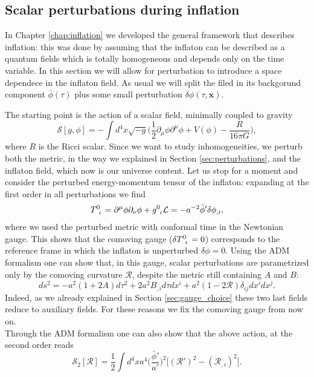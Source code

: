 \subsection{Scalar perturbations during inflation}
In Chapter \ref{chap:inflation} we developed the general framework that describes inflation: this was done by assuming that the inflaton can be described as a quantum fields which is totally homogeneous and depends only on the time variable. In this section we will allow for perturbation to introduce a space dependece in the inflaton field. As usual we will split the filed in its backgorund component $\bar\phi(\tau)$ plus some small perturbation $\delta\phi(\tau,\mathbf x)$.

The starting point is the action of a scalar field, minimally coupled to gravity
$$\mathcal{S} [g,\phi]=-\int d^4x\sqrt{-g}\bigg(\frac{1}{2}\partial_\mu\phi\partial^\mu\phi+V(\phi)-\frac{R}{16\pi G}\bigg),$$where $R$ is the Ricci scalar. Since we want to study inhomogeneities, we perturb both the metric, in the way we explained in Section \ref{sec:perturbations}, and the inflaton field, which now is our universe content. Let us stop for a moment and consider the perturbed energy-momentum tensor of the inflaton: expanding at the first order in all perturbations we find
\begin{align*}
    \tensor{T}{^0_i}=\partial^\mu\phi\partial_\nu\phi+\tensor{g}{^0_i}\mathcal{L}=-a^{-2}\bar\phi'\delta\phi_{,i},
\end{align*}
where we used the perturbed metric with conformal time in the Newtonian gauge. This shows that the comoving gauge ($\delta\tensor{T}{^0_i}=0$) corresponds to the reference frame in which the inflaton is unperturbed $\delta\phi=0$.
Using the ADM formalism one can show that, in this gauge, scalar perturbations are parametrized only by the comoving curvature $\mathcal{R}$, despite the metric still containing $A$ and $B$:
$$ds^2=-a^2(1+2A)d\tau^2+2a^2B_{,i}d\tau dx^i+a^2(1-2\mathcal{R})\delta_{ij}dx^idx^j.$$
Indeed, as we already explained in Section \ref{sec:gauge_choice} these two last fields reduce to auxiliary fields. For these reasons we fix the comoving gauge from now on.\\
Through the ADM formalism one can also show \cite{baumann2012tasilecturesinflation} that the above action, at the second order reads
\begin{equation}
    \mathcal{S}_{2}[\mathcal{R} ]=\frac{1}{2}\int d^4x a^4\bigg(\frac{\bar \phi'}{a'}\bigg)^2\Big[(\mathcal{R}')^2-(\mathcal{R}_{,i})^2\Big].
\end{equation}

